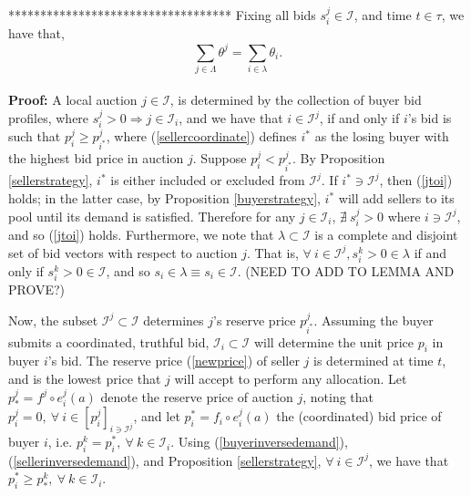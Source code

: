 \documentclass[12pt]{article}
\theoremstyle{definition}
\newcommand{\mcI}{\mathcal{I}}
\begin{document}
\begin{multicols}{2}
{***********************************
\fi
Fixing all bids $s_i^j \in \mcI$, and time $t\in\tau$, we have that,
\begin{equation}\label{unioneq}
    \displaystyle\sum_{j\in\Lambda} \theta^j = \sum_{i\in\lambda} \theta_i.
\end{equation}
}\\
\textbf{Proof:}
A local auction $j\in\mcI$, is determined by the collection of buyer bid
profiles, where $s_i^j > 0 \Rightarrow j\in\mcI_i$, and we have that $i\in\mcI^j$,
if and only if $i$'s bid is such that $p_i^j \ge p_{i^*}^j$, where
(\ref{sellercoordinate}) defines $i^*$ as the losing buyer with the highest bid
price in auction $j$.
Suppose $p_i^j < p_{i^*}^j$. By Proposition \ref{sellerstrategy}, $i^*$ is either included or excluded from $\mcI^j$. 
If $i^* \ni \mcI^j$, then (\ref{jtoi}) holds; in the latter case, by
Proposition \ref{buyerstrategy}, $i^*$
will add sellers to its pool until its demand is satisfied. Therefore for any
$j\in\mcI_i$, $\nexists \ s_i^j > 0$ where $i \ni \mcI^j$, and so (\ref{jtoi})
holds.
Furthermore, we note that $\lambda \subset \mcI$ is a complete and disjoint set
of bid vectors with respect to auction $j$. That is, $\forall \ i \in \mcI^j,
s_i^k > 0 \in \lambda$ if and only if $s_i^k>0 \in\mcI$, and so $s_i \in \lambda
\equiv s_i \in \mcI$. (NEED TO ADD TO LEMMA AND PROVE?)

Now, the subset $\mcI^j \subset \mcI$
determines $j$'s reserve price $p_{i^*}^j$. Assuming the buyer submits a
coordinated, truthful bid, $\mcI_i\subset \mcI$ 
will determine the unit price $p_{i}$ in buyer $i$'s bid.
The reserve price (\ref{newprice}) of seller $j$ is determined at time $t$, and is
the lowest price that $j$ will accept to perform any allocation.
Let $p_*^j = f^j \circ e_i^j(a) $ denote the reserve
price of auction $j$, noting that $p_i^j=0, \ \forall \ i \in
[p_i^j]_{i\ni\mcI^j}$, and let $p_i^*= f_i \circ e_i^j(a)$ the (coordinated) bid price of buyer $i$, i.e. $p_i^k = p_i^*,
\ \forall \ k \in\mcI_i$. 
Using (\ref{buyerinversedemand}), (\ref{sellerinversedemand}), and Proposition
\ref{sellerstrategy}, $\forall \ i \in \mcI^j$, we have that $p_i^* \ge p_*^k,
\ \forall \ k \in\mcI_i$.

\iffalse
Now, we have,
\begin{equation}\label{rho}
    \rho^j(p_*^j) \le \displaystyle\sum_{i\in\mcI^j} e_i(a(s_i^j)),
\end{equation}
from (\ref{datademand}), (\ref{buyerinversedemand}),
(\ref{sellerinversedemand}), and so $p_i^j \ge p_{*}^j \ge p_i^k, \ \forall \ i \in
[p_i^j]_{i\in\mcI^j}$ and $\forall \ k \in [p_i^k]_{k\in\mcI_i}$
\fi


\end{multicols}
\end{document}
